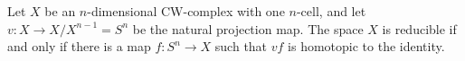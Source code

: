 Let $X$ be an $n$-dimensional CW-complex with one $n$-cell, and let $v: X \rightarrow X/X^{n-1} = S^n$ be the natural projection map. The space $X$ is reducible if and only if there is a map $f: S^n \rightarrow X$ such that $vf$ is homotopic to the identity.
